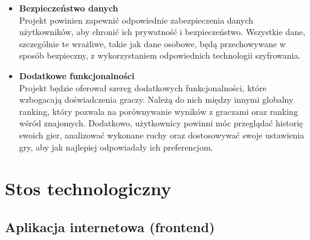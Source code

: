 \documentclass[12pt,a4paper]{article}
\begin{document}
\begin{itemize}
    \item \textbf{Bezpieczeństwo danych}\\
    Projekt powinien zapewnić odpowiednie zabezpieczenia danych użytkowników, aby chronić ich prywatność i bezpieczeństwo. Wszystkie dane, szczególnie te wrażliwe, takie jak dane osobowe, będą przechowywane w sposób bezpieczny, z wykorzystaniem odpowiednich technologii szyfrowania.

    \item \textbf{Dodatkowe funkcjonalności}\\
    Projekt będzie oferował szereg dodatkowych funkcjonalności, które wzbogacają doświadczenia graczy. Należą do nich między innymi globalny ranking, który pozwala na porównywanie wyników z graczami oraz ranking wśród znajomych. Dodatkowo, użytkownicy powinni móc przeglądać historię swoich gier, analizować wykonane ruchy oraz dostosowywać swoje ustawienia gry, aby jak najlepiej odpowiadały ich preferencjom.

\end{itemize}

\newpage

\section{Stos technologiczny}

\subsection{Aplikacja internetowa (frontend)}
\end{document}

